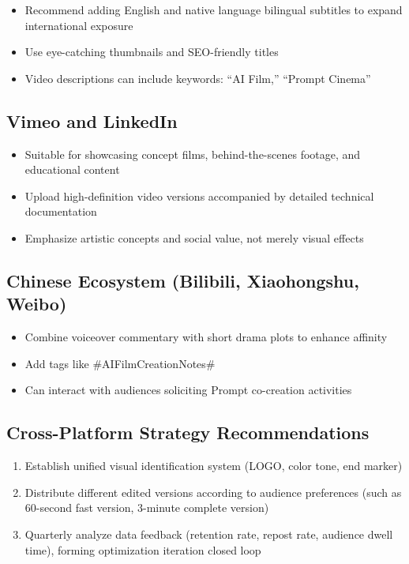\begin{itemize}
\item Recommend adding English and native language bilingual subtitles to expand international exposure
\item Use eye-catching thumbnails and SEO-friendly titles
\item Video descriptions can include keywords: ``AI Film,'' ``Prompt Cinema''
\end{itemize}

\subsection{Vimeo and LinkedIn}

\begin{itemize}
\item Suitable for showcasing concept films, behind-the-scenes footage, and educational content
\item Upload high-definition video versions accompanied by detailed technical documentation
\item Emphasize artistic concepts and social value, not merely visual effects
\end{itemize}

\subsection{Chinese Ecosystem (Bilibili, Xiaohongshu, Weibo)}

\begin{itemize}
\item Combine voiceover commentary with short drama plots to enhance affinity
\item Add tags like \#AIFilmCreationNotes\#
\item Can interact with audiences soliciting Prompt co-creation activities
\end{itemize}

\subsection{Cross-Platform Strategy Recommendations}

\begin{enumerate}
\item Establish unified visual identification system (LOGO, color tone, end marker)
\item Distribute different edited versions according to audience preferences (such as 60-second fast version, 3-minute complete version)
\item Quarterly analyze data feedback (retention rate, repost rate, audience dwell time), forming optimization iteration closed loop
\end{enumerate}

